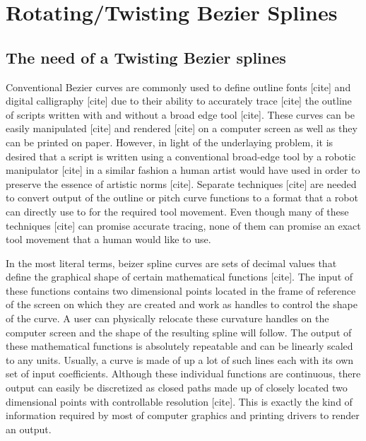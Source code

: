 \section{Rotating/Twisting Bezier Splines}
\label{Chapter:SplineModelling}

    \subsection{The need of a Twisting Bezier splines}

    Conventional Bezier curves are commonly used to define outline fonts [cite] and digital calligraphy [cite] due to their ability to accurately trace [cite] the outline of scripts written with and without a broad edge tool [cite]. These curves can be easily manipulated [cite] and rendered [cite] on a computer screen as well as they can be printed on paper. However, in light of the underlaying problem, it is desired that a script is written using a conventional broad-edge tool by a robotic manipulator [cite] in a similar fashion a human artist would have used in order to preserve the essence of artistic norms [cite]. Separate techniques [cite] are needed to convert output of the outline or pitch curve functions to a format that a robot can directly use to for the required tool movement. Even though many of these techniques [cite] can promise accurate tracing, none of them can promise an exact tool movement that a human would like to use.

    In the most literal terms, beizer spline curves are sets of decimal values that define the graphical shape of certain mathematical functions [cite]. The input of these functions contains two dimensional points located in the frame of reference of the screen on which they are created and work as handles to control the shape of the curve. A user can physically relocate these curvature handles on the computer screen and the shape of the resulting spline will follow. The output of these mathematical functions is absolutely repeatable and can be linearly scaled to any units. Usually, a curve is made of up a lot of such lines each with its own set of input coefficients. Although these individual functions are continuous, there output can easily be discretized as closed paths made up of closely located two dimensional points with controllable resolution [cite]. This is exactly the kind of information required by most of computer graphics and printing drivers to render an output.

